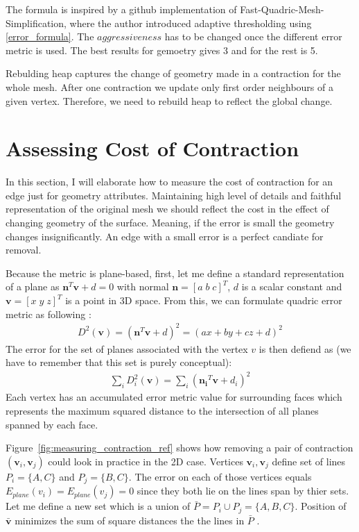 The formula is inspired by a github implementation of Fast-Quadric-Mesh-Simplification, where the author introduced adaptive thresholding using \ref{error_formula}. The $aggressiveness$ has to be changed once the different error metric is used. The best results for gemoetry gives 3 and for the rest is 5.

Rebulding heap captures the change of geometry made in a  contraction for the whole mesh. After one contraction we update only first order neighbours of a given vertex. Therefore, we need to rebuild heap to reflect the global change.

\section{Assessing Cost of Contraction}
In this section, I will elaborate how to measure the cost of contraction for an edge just for geometry attributes. Maintaining high level of details and faithful representation of the original mesh we should reflect the cost in the effect of changing geometry of the surface. Meaning, if the error is small the geometry changes insignificantly. An edge with a small error is a perfect candiate for removal.

Because the metric is plane-based, first, let me define a standard representation of a plane as $\mathbf{n}^T\mathbf{v}+d=0$ with normal  $\mathbf{n} = [a\;b\;c]^T$, $d$ is a scalar constant and $\mathbf{v} = [x\;y\;z]^T$ is a point in 3D space. From this, we can formulate quadric error metric as following \cite{garland99}:
\begin{align}
D^2(\mathbf{v}) = (\mathbf{n}^T\mathbf{v}+d)^2 = (ax + by + cz + d)^2
\label{quadric_distance}
\end{align}
The error for the set of planes associated with the vertex $v$ is then defiend as (we have to remember that this set is purely conceptual):
\begin{align}
\sum_{i} D_i^2(\mathbf{v}) = \sum_{i} (\mathbf{n_i}^T\mathbf{v}+d_i)^2
\end{align}
Each vertex has an accumulated error metric value for surrounding faces  which represents the maximum squared distance to the intersection of all planes spanned by each face.

Figure~\ref{fig:measuring_contraction_ref} shows how removing a pair of contraction $(\mathbf{v}_i, \mathbf{v}_j)$ could look in practice in the 2D case. Vertices $\mathbf{v}_i, \mathbf{v}_j$ define set of lines $P_i = \{A,C\}$ and $P_j = \{B, C\}$. The error on each of those vertices equals $E_{plane}(v_i) = E_{plane}(v_j) = 0$ since they both lie on the lines span by thier sets. Let me define a new set which is a union of $ \bar{P} = P_i \cup P_j = \{ A,B,C \}$. Position of $\bar{\mathbf{v}}$ minimizes the sum of square distances the the lines in $\bar{P}$ \cite{garland99}.

